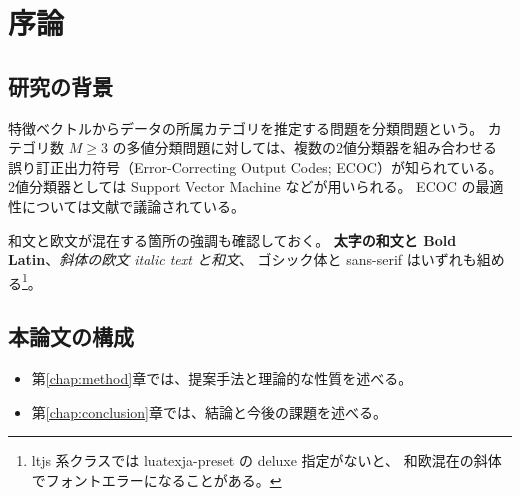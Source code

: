 \chapter{序論}

\section{研究の背景}

特徴ベクトルからデータの所属カテゴリを推定する問題を分類問題という。
カテゴリ数 $M \geq 3$ の多値分類問題に対しては、複数の2値分類器を組み合わせる
誤り訂正出力符号（Error-Correcting Output Codes; ECOC）\cite{dietterich1994}が知られている。
2値分類器としては Support Vector Machine \cite{vapnik1998} などが用いられる。
ECOC の最適性については文献\cite{kumoi2021}で議論されている。

和文と欧文が混在する箇所の強調も確認しておく。
\textbf{太字の和文と Bold Latin}、\textit{斜体の欧文 italic text と和文}、
\textsf{ゴシック体と sans-serif} はいずれも組める\footnote{%
  ltjs 系クラスでは luatexja-preset の deluxe 指定がないと、
  和欧混在の斜体でフォントエラーになることがある。}。

\section{本論文の構成}

\begin{itemize}
  \item 第\ref{chap:method}章では、提案手法と理論的な性質を述べる。
  \item 第\ref{chap:conclusion}章では、結論と今後の課題を述べる。
\end{itemize}
